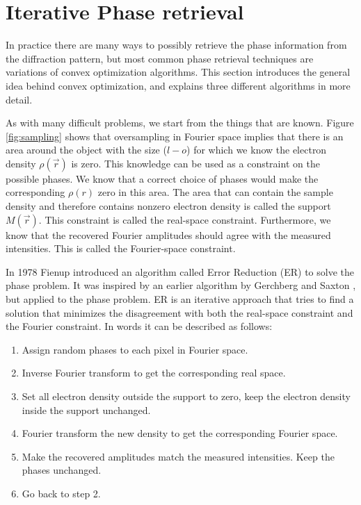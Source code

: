 \section{Iterative Phase retrieval}
In practice there are many ways to possibly retrieve the phase information from the diffraction pattern, but most common phase retrieval techniques are variations of convex optimization algorithms. This section introduces the general idea behind convex optimization, and explains three different algorithms in more detail.

As with many difficult problems, we start from the things that are known. Figure \ref{fig:sampling} shows that oversampling in Fourier space implies that there is an area  around the object with the size ($l-o$) for which we know the electron density $\rho(\vec{r})$ is zero. This knowledge can be used as a constraint on the possible phases. We know that a correct choice of phases would make the corresponding $\rho(r)$ zero in this area. The area that can contain the sample density  and therefore contains nonzero electron density is called the support $M(\vec{r})$. This constraint is called the real-space constraint. Furthermore, we know that the recovered Fourier amplitudes should agree with the measured intensities. This is called the Fourier-space constraint. 

In 1978 Fienup \cite{Fienup1978} introduced an algorithm called Error Reduction (ER) to solve the phase problem. It was inspired by an earlier algorithm by Gerchberg and Saxton \cite{GerchbergSaxton1972}, but applied to the phase problem. ER is an iterative approach that tries to find a solution that minimizes the disagreement with both the real-space constraint and the Fourier constraint. In words it can be described as follows:\\
\begin{enumerate}
\item Assign random phases to each pixel in Fourier space.
\item Inverse Fourier transform to get the corresponding real space.
\item Set all electron density outside the support to zero, keep the electron density inside the support unchanged.
\item Fourier transform the new density to get the corresponding Fourier space.
\item Make the recovered amplitudes match the measured intensities. Keep the phases unchanged.
\item Go back to step 2.\\
\end{enumerate}


